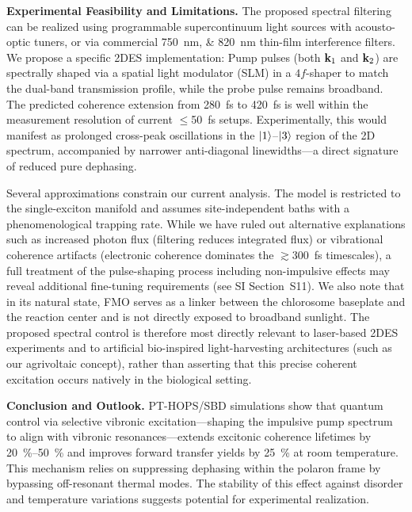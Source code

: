\documentclass[journal=jpcl,manuscript=letter]{achemso}
\begin{document}
\textbf{Experimental Feasibility and Limitations.}
The proposed spectral filtering can be realized using programmable supercontinuum light sources with acousto-optic tuners,\cite{Gunthardt2023} or via commercial \SIlist{750;820}{\nano\meter} thin-film interference filters. We propose a specific 2DES implementation:\cite{Sebastian2024} Pump pulses (both $\vb{k}_1$ and $\vb{k}_2$) are spectrally shaped via a spatial light modulator (SLM) in a $4f$-shaper to match the dual-band transmission profile, while the probe pulse remains broadband.
The predicted coherence extension from \SI{280}{\femto\second} to \SI{420}{\femto\second} is well within the measurement resolution of current $\leq$\SI{50}{\femto\second} setups.\cite{Engel2007} Experimentally, this would manifest as prolonged cross-peak oscillations in the $\ket{1}$--$\ket{3}$ region of the 2D spectrum, accompanied by narrower anti-diagonal linewidths—a direct signature of reduced pure dephasing. 

Several approximations constrain our current analysis. The model is restricted to the single-exciton manifold and assumes site-independent baths with a phenomenological trapping rate. While we have ruled out alternative explanations such as increased photon flux (filtering reduces integrated flux) or vibrational coherence artifacts (electronic coherence dominates the $\gtrsim$\SI{300}{\femto\second} timescales), a full treatment of the pulse-shaping process including non-impulsive effects may reveal additional fine-tuning requirements (see SI Section~S11). We also note that in its natural state, FMO serves as a linker between the chlorosome baseplate and the reaction center and is not directly exposed to broadband sunlight.\cite{Blankenship2011} The proposed spectral control is therefore most directly relevant to laser-based 2DES experiments and to artificial bio-inspired light-harvesting architectures (such as our agrivoltaic concept), rather than asserting that this precise coherent excitation occurs natively in the biological setting.

\textbf{Conclusion and Outlook.}
PT-HOPS/SBD simulations show that quantum control via selective vibronic excitation---shaping the impulsive pump spectrum to align with vibronic resonances---extends excitonic coherence lifetimes by \SIrange{20}{50}{\percent} and improves forward transfer yields by \SI{25}{\percent} at room temperature. This mechanism relies on suppressing dephasing within the polaron frame by bypassing off-resonant thermal modes. The stability of this effect against disorder and temperature variations suggests potential for experimental realization.
\end{document}
